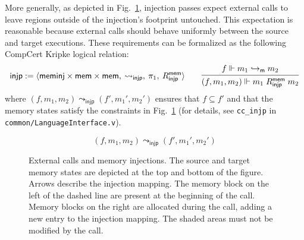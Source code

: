 \documentclass[11pt,oneside,draft]{book}
\theoremstyle{definition}
\newcommand{\kw}[1]{\ensuremath{ \mathsf{#1} }}
\begin{document}
More generally,
as depicted in Fig.~\ref{fig:injp},
injection passes expect external calls
to leave regions outside of the injection's footprint untouched.
This expectation is reasonable because
external calls
should behave uniformly between the source and target executions.
These requirements can be formalized as the
following CompCert Kripke logical relation:
\[
  \kw{injp} :=
    \langle
      \kw{meminj} \times \kw{mem} \times \kw{mem}, \:
      {\leadsto_\kw{injp}}, \:
      \pi_1, \:
      R^\kw{mem}_\kw{injp}
    \rangle
  \qquad
  \begin{prooftree}
    \hypo{f \Vdash m_1 \hookrightarrow_\kw{m} m_2}
    \infer1{(f, m_1, m_2) \Vdash m_1 \mathrel{R^\kw{mem}_\kw{injp}} m_2}
  \end{prooftree}
\]
where $(f, m_1, m_2) \leadsto_\kw{injp} (f', m_1', m_2')$
ensures that $f \subseteq f'$ and that the memory states
satisfy the constraints in Fig.~\ref{fig:injp}
(for details,
see \texttt{cc\_injp} in \texttt{common/LanguageInterface.v}).

\begin{figure} %
  \[ (f, m_1, m_2) \leadsto_\kw{injp} (f', m_1', m_2') \]
  \caption[External calls and memory injections]%
   {External calls and memory injections.
    The source and target memory states are
    depicted at the top and bottom
    of the figure. Arrows describe the injection mapping.
    The memory block on the left of the dashed line
    are present at the beginning of the call.
    Memory blocks on the right
    are allocated during the call,
    adding a new entry to the injection mapping.
    The shaded areas must not be modified by the call.
  }
  \label{fig:injp}
\end{figure}
\end{document}
